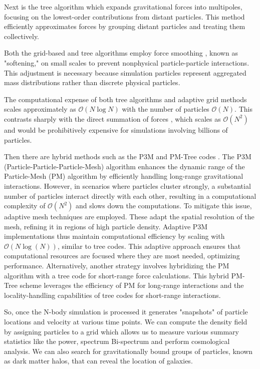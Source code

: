 Next is the tree algorithm \cite{barnes1986Natur.324..446B} which expands gravitational forces into multipoles, focusing on the lowest-order contributions from distant particles. This method efficiently approximates forces by grouping distant particles and treating them collectively.

Both the grid-based and tree algorithms employ force smoothing \cite{Dehnen_2001}, known as "softening," on small scales to prevent nonphysical particle-particle interactions. This adjustment is necessary because simulation particles represent aggregated mass distributions rather than discrete physical particles.

The computational expense of both tree algorithms and adaptive grid methods scales approximately as $ \mathcal{O}(N \log N)$ with the number of particles $\mathcal{O}(N)$. This contrasts sharply with the direct summation of forces \cite{Wang_2015}, which scales as $\mathcal{O}(N^2)$ and would be prohibitively expensive for simulations involving billions of particles.

Then there are hybrid methods such as the P3M and PM-Tree codes \cite{Springel2005Natur.435..629S}. The P3M (Particle-Particle-Particle-Mesh) algorithm enhances the dynamic range of the Particle-Mesh (PM) algorithm by efficiently handling long-range gravitational interactions. However, in scenarios where particles cluster strongly, a substantial number of particles interact directly with each other, resulting in a computational complexity of $\mathcal{O}(N^2)$ and slows down the computations.
To mitigate this issue, adaptive mesh techniques are employed. These adapt the spatial resolution of the mesh, refining it in regions of high particle density. Adaptive P3M \cite{Norman} implementations thus maintain computational efficiency by scaling with $\mathcal{O}(N \log(N))$, similar to tree codes. This adaptive approach ensures that computational resources are focused where they are most needed, optimizing performance. 
Alternatively, another strategy involves hybridizing the PM algorithm with a tree code for short-range force calculations\cite{Springel2005Natur.435..629S}. This hybrid PM-Tree scheme leverages the efficiency of PM for long-range interactions and the locality-handling capabilities of tree codes for short-range interactions.

So, once the N-body simulation is processed it generates "snapshots" of particle locations and velocity at various time points. We can compute the density field by assigning particles to a grid which allows us to measure various summary statistics like the power, spectrum Bi-spectrum and perform cosmological analysis. We can also search for gravitationally bound groups of particles, known as dark matter halos, that can reveal the location of galaxies.
 

 